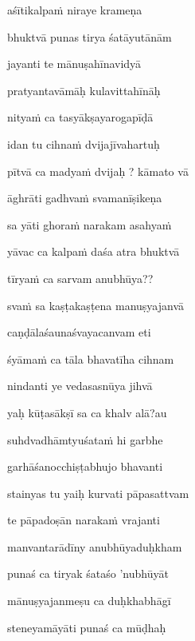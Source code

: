 \nemslokac 
aśītikalpa\.m niraye krameṇa
\dontdisplaylinenum

\nemslokad 
bhuktvā punas tirya śatāyutānām \veg\dontdisplaylinenum

\ujvers\nemsloka 
jayanti te mānuṣahīnavidyā
\dontdisplaylinenum

\nemslokab 
pratyantavāmāḥ kulavittahīnāḥ \danda\dontdisplaylinenum

\nemslokac 
nitya\.m ca tasyākṣayarogapīḍā
\dontdisplaylinenum

\nemslokad 
idan tu cihna\.m dvijajīvahartuḥ \veg\dontdisplaylinenum

\ujvers\nemsloka 
pītvā ca madya\.m dvijaḥ ? kāmato vā
\dontdisplaylinenum

\nemslokab 
āghrāti gadhva\.m svamanīṣikeṇa \danda\dontdisplaylinenum

\nemslokac 
sa yāti ghora\.m narakam asahya\.m
\dontdisplaylinenum

\nemslokad 
yāvac ca kalpa\.m daśa atra bhuktvā \veg\dontdisplaylinenum

\ujvers\nemsloka 
tīrya\.m ca sarvam anubhūya??
\dontdisplaylinenum

\nemslokab 
sva\.m sa kaṣṭakaṣṭena manuṣyajanvā \danda\dontdisplaylinenum

\nemslokac 
caṇḍālaśaunaśvayacanvam eti
\dontdisplaylinenum

\nemslokad 
śyāma\.m ca tāla bhavatīha cihnam \veg\dontdisplaylinenum

\ujvers\nemsloka 
nindanti ye vedasasnūya jihvā
\dontdisplaylinenum

\nemslokab 
yaḥ kūṭasākṣī sa ca khalv alā?au \danda\dontdisplaylinenum

\nemslokac 
suhdvadhāmtyuśata\.m hi garbhe
\dontdisplaylinenum

\nemslokad 
garhāśanocchiṣṭabhujo bhavanti \veg\dontdisplaylinenum

\ujvers\nemsloka 
stainyas tu yaiḥ kurvati pāpasattvam
\dontdisplaylinenum

\nemslokab 
te pāpadoṣān naraka\.m vrajanti \danda\dontdisplaylinenum

\nemslokac 
manvantarādīny anubhūyaduḥkham
\dontdisplaylinenum

\nemslokad 
punaś ca tiryak śataśo 'nubhūyāt \veg\dontdisplaylinenum

\ujvers\nemsloka 
mānuṣyajanmeṣu ca duḥkhabhāgī
\dontdisplaylinenum

\nemslokab 
steneyamāyāti punaś ca mūḍhaḥ \danda\dontdisplaylinenum

